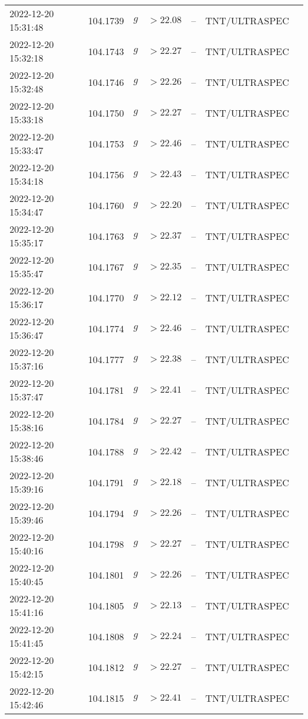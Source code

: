 \documentclass{nature_plusfigure}
\begin{document}
\begin{supplement}
\begin{center}
\begin{longtable}{lllllll}
2022-12-20 15:31:48 & 104.1739 & $g$ & $>22.08$ & -- & TNT/ULTRASPEC &  \\ 
2022-12-20 15:32:18 & 104.1743 & $g$ & $>22.27$ & -- & TNT/ULTRASPEC &  \\ 
2022-12-20 15:32:48 & 104.1746 & $g$ & $>22.26$ & -- & TNT/ULTRASPEC &  \\ 
2022-12-20 15:33:18 & 104.1750 & $g$ & $>22.27$ & -- & TNT/ULTRASPEC &  \\ 
2022-12-20 15:33:47 & 104.1753 & $g$ & $>22.46$ & -- & TNT/ULTRASPEC &  \\ 
2022-12-20 15:34:18 & 104.1756 & $g$ & $>22.43$ & -- & TNT/ULTRASPEC &  \\ 
2022-12-20 15:34:47 & 104.1760 & $g$ & $>22.20$ & -- & TNT/ULTRASPEC &  \\ 
2022-12-20 15:35:17 & 104.1763 & $g$ & $>22.37$ & -- & TNT/ULTRASPEC &  \\ 
2022-12-20 15:35:47 & 104.1767 & $g$ & $>22.35$ & -- & TNT/ULTRASPEC &  \\ 
2022-12-20 15:36:17 & 104.1770 & $g$ & $>22.12$ & -- & TNT/ULTRASPEC &  \\ 
2022-12-20 15:36:47 & 104.1774 & $g$ & $>22.46$ & -- & TNT/ULTRASPEC &  \\ 
2022-12-20 15:37:16 & 104.1777 & $g$ & $>22.38$ & -- & TNT/ULTRASPEC &  \\ 
2022-12-20 15:37:47 & 104.1781 & $g$ & $>22.41$ & -- & TNT/ULTRASPEC &  \\ 
2022-12-20 15:38:16 & 104.1784 & $g$ & $>22.27$ & -- & TNT/ULTRASPEC &  \\ 
2022-12-20 15:38:46 & 104.1788 & $g$ & $>22.42$ & -- & TNT/ULTRASPEC &  \\ 
2022-12-20 15:39:16 & 104.1791 & $g$ & $>22.18$ & -- & TNT/ULTRASPEC &  \\ 
2022-12-20 15:39:46 & 104.1794 & $g$ & $>22.26$ & -- & TNT/ULTRASPEC &  \\ 
2022-12-20 15:40:16 & 104.1798 & $g$ & $>22.27$ & -- & TNT/ULTRASPEC &  \\ 
2022-12-20 15:40:45 & 104.1801 & $g$ & $>22.26$ & -- & TNT/ULTRASPEC &  \\ 
2022-12-20 15:41:16 & 104.1805 & $g$ & $>22.13$ & -- & TNT/ULTRASPEC &  \\ 
2022-12-20 15:41:45 & 104.1808 & $g$ & $>22.24$ & -- & TNT/ULTRASPEC &  \\ 
2022-12-20 15:42:15 & 104.1812 & $g$ & $>22.27$ & -- & TNT/ULTRASPEC &  \\ 
2022-12-20 15:42:46 & 104.1815 & $g$ & $>22.41$ & -- & TNT/ULTRASPEC &  \\ 

\end{longtable}
\end{center}
\end{supplement}
\end{document}
